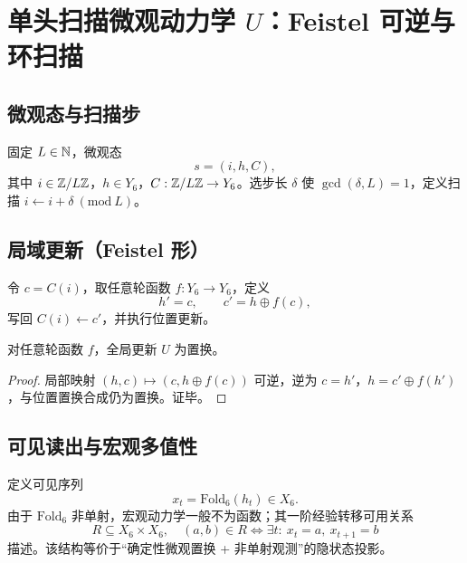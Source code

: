 \section{单头扫描微观动力学 \texorpdfstring{$U$}{U}：Feistel 可逆与环扫描}
\label{sec:single-head}

\subsection{微观态与扫描步}

固定 $L\in\mathbb{N}$，微观态
\[
s=(i,h,C),
\]
其中 $i\in\mathbb{Z}/L\mathbb{Z}$，$h\in Y_6$，$C:\mathbb{Z}/L\mathbb{Z}\to Y_6$。选步长 $\delta$ 使 $\gcd(\delta,L)=1$，定义扫描 $i\leftarrow i+\delta\ (\mathrm{mod}\ L)$。

\subsection{局域更新（Feistel 形）}

令 $c=C(i)$，取任意轮函数 $f:Y_6\to Y_6$，定义
\[
h'=c,\qquad c'=h\oplus f(c),
\]
写回 $C(i)\leftarrow c'$，并执行位置更新。

\begin{theorem}[可逆性]\label{thm:feistel-permutation}
对任意轮函数 $f$，全局更新 $U$ 为置换。
\end{theorem}

\begin{proof}
局部映射 $(h,c)\mapsto (c,h\oplus f(c))$ 可逆，逆为 $c=h'$，$h=c'\oplus f(h')$，与位置置换合成仍为置换。证毕。
\end{proof}

\subsection{可见读出与宏观多值性}

定义可见序列
\[
x_t=\mathrm{Fold}_6(h_t)\in X_6.
\]
由于 $\mathrm{Fold}_6$ 非单射，宏观动力学一般不为函数；其一阶经验转移可用关系
\[
R\subseteq X_6\times X_6,\quad (a,b)\in R\iff \exists t:\ x_t=a,\ x_{t+1}=b
\]
描述。该结构等价于“确定性微观置换 + 非单射观测”的隐状态投影。

